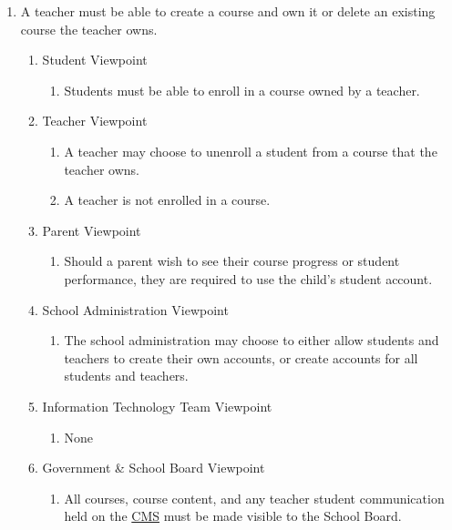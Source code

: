 \documentclass[]{article}
\begin{document}
%
\begin{enumerate}[{BE}1.]
	\item A teacher must be able to create a course and own it or delete an 
existing course the teacher owns.
	\begin{enumerate}[{VP1}.1]
		\item Student Viewpoint
			\begin{enumerate}
				\item Students must be able to enroll in a course owned by a teacher.
			\end{enumerate}
		\item Teacher Viewpoint
			\begin{enumerate}
				\item A teacher may choose to unenroll a student from a course that the 
teacher owns.
				\item A teacher is not enrolled in a course.
			\end{enumerate}
		\item Parent Viewpoint
			\begin{enumerate}
				\item Should a parent wish to see their course progress or student 
performance, they are required to use the child's student account.
			\end{enumerate}
		\item School Administration Viewpoint
			\begin{enumerate}
				\item The school administration may choose to either allow students and 
teachers to create their own accounts, or create accounts for all students and 
teachers.
			\end{enumerate}
		\item Information Technology Team Viewpoint
			\begin{enumerate}
				\item None
			\end{enumerate}
		\item Government \& School Board Viewpoint
			\begin{enumerate}
				\item All courses, course content, and any teacher student communication 
          held on the \underline{CMS} must be made visible to the School Board.
			\end{enumerate}
	\end{enumerate}


\end{enumerate}
\end{document}
